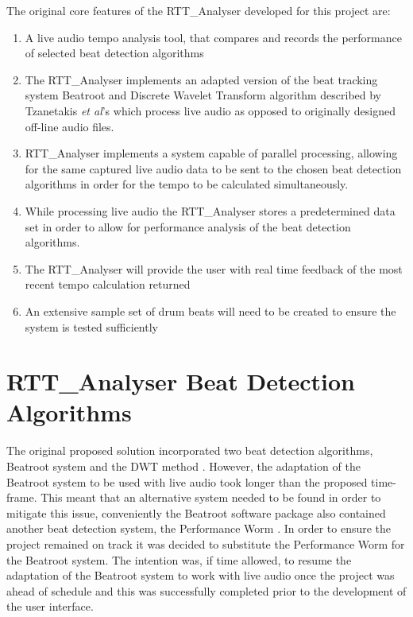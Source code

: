 \documentclass[a4paper, 11pt]{article}
\begin{document}
The original core features of the RTT\_Analyser developed for this project are:

\begin{enumerate}
\item A live audio tempo analysis tool, that compares and records the performance of selected beat detection algorithms
\item The RTT\_Analyser implements an adapted version of the beat tracking system Beatroot and Discrete Wavelet Transform algorithm described by Tzanetakis \textit{et al}'s\cite{tzane1} which process live audio as opposed to originally designed off-line audio files.
\item RTT\_Analyser implements a system capable of parallel processing, allowing for the same captured live audio data to be sent to the chosen beat detection algorithms in order for the tempo to be calculated simultaneously.
\item While processing live audio the RTT\_Analyser stores a predetermined data set in order to allow for performance analysis of the beat detection algorithms.
\item The RTT\_Analyser will provide the user with real time feedback of the most recent tempo calculation returned
\item An extensive sample set of drum beats will need to be created to ensure the system is tested sufficiently
\end{enumerate}



\maketitle{}\section{RTT\_Analyser Beat Detection Algorithms}
The original proposed solution incorporated two beat detection algorithms, Beatroot system \cite{dixon1} and the DWT method \cite{tzane1}. However, the adaptation of the Beatroot system to be used with live audio took longer than the proposed time-frame. This meant that an alternative system needed to be found in order to mitigate this issue, conveniently the Beatroot software package also contained another beat detection system, the Performance Worm \cite{dixon3}. In order to ensure the project remained on track it was decided to substitute the Performance Worm for the Beatroot system. The intention was, if time allowed, to resume the adaptation of the Beatroot system to work with live audio once the project was ahead of schedule and this was successfully completed prior to the development of the user interface.
\end{document}
